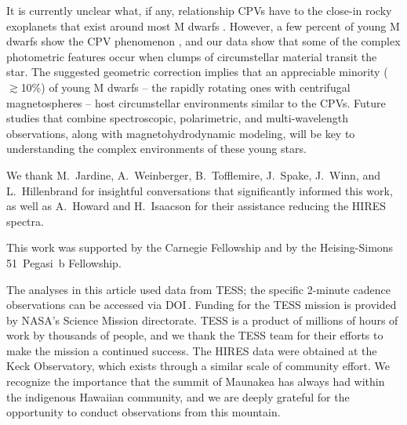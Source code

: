 \documentclass[11pt,twocolumn,tighten,linenumbers]{aastex7}
\begin{document}
It is currently unclear what, if any, relationship CPVs have to the
close-in rocky exoplanets that exist around most M dwarfs
\citep{Dressing2015}.  However, a few percent of young M dwarfs show
the CPV phenomenon \citep{Rebull2020}, and our data show that some of
the complex photometric features occur when clumps of circumstellar
material transit the star.  The suggested geometric correction implies
that an appreciable minority ($\gtrsim$10\%) of young M dwarfs -- the
rapidly rotating ones with centrifugal magnetospheres -- host
circumstellar environments similar to the CPVs.  Future studies that
combine spectroscopic, polarimetric, and multi-wavelength
observations, along with magnetohydrodynamic modeling, will be key to
understanding the complex environments of these young
stars.

\begin{acknowledgements}
  We thank M.~Jardine, A.~Weinberger, B.~Tofflemire,
  J.~Spake, J.~Winn, and L.~Hillenbrand for insightful conversations
  that significantly informed this work, as well as A.~Howard and
  H.~Isaacson for their assistance reducing the HIRES spectra.

  This work was supported by the Carnegie Fellowship and by the
  Heising-Simons 51~Pegasi~b Fellowship.

	The analyses in this article used data from TESS; the specific
	2-minute cadence observations can be accessed via
	DOI\,.
  Funding for the TESS mission is provided by NASA’s Science Mission
  directorate.
  TESS is a product of millions of hours of work by thousands of people, and
  we thank the TESS team for their efforts to make the mission a
  continued success.
  The HIRES data were obtained at the Keck Observatory, which exists
  through a similar scale of community effort.
  We recognize the importance that the summit of Maunakea has always had
  within the indigenous Hawaiian community, and we are deeply grateful 
  for the opportunity to conduct observations from this mountain.
\end{acknowledgements}


\end{document}
